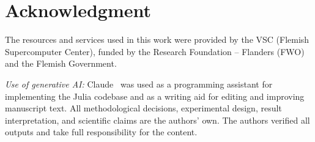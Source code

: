 \documentclass[conference]{IEEEtran}
\newif\ifextended
\begin{document}
\section*{Acknowledgment}
The resources and services used in this work were provided by the VSC (Flemish Supercomputer Center), funded by the Research Foundation -- Flanders (FWO) and the Flemish Government.

\noindent\textit{Use of generative AI:}
Claude~\cite{anthropic2025claude} was used as a programming assistant for implementing the Julia codebase and as a writing aid for editing and improving manuscript text. All methodological decisions, experimental design, result interpretation, and scientific claims are the authors' own. The authors verified all outputs and take full responsibility for the content.




\ifextended
\newpage
\onecolumn
\appendices

\fi
\end{document}
